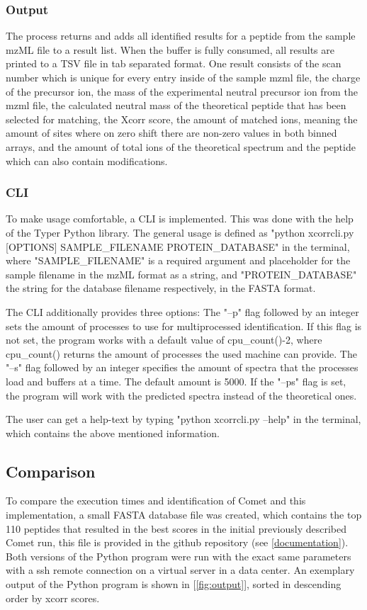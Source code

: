 \documentclass[11pt]{article}
\begin{document}
\subsubsection{Output}
The process returns and adds all identified results for a peptide from the sample mzML file to a result list. When the buffer is fully consumed, all results are printed to a TSV file in tab separated format. One result consists of the scan number which is unique for every entry inside of the sample mzml file, the charge of the precursor ion, the mass of the experimental neutral precursor ion from the mzml file, the calculated neutral mass of the theoretical peptide that has been selected for matching, the Xcorr score, the amount of matched ions, meaning the amount of sites where on zero shift there are non-zero values in both binned arrays, and the amount of total ions of the theoretical spectrum and the peptide which can also contain modifications.

\subsubsection{CLI}
To make usage comfortable, a CLI is implemented. This was done with the help of the Typer Python library. The general usage is defined as "python xcorrcli.py [OPTIONS] SAMPLE\_FILENAME PROTEIN\_DATABASE" in the terminal, where "SAMPLE\_FILENAME" is a required argument and placeholder for the sample filename in the mzML format as a string, and "PROTEIN\_DATABASE" the string for the database filename respectively, in the FASTA format. 

The CLI additionally provides three options: The "--p" flag followed by an integer sets the amount of processes to use for multiprocessed identification. If this flag is not set, the program works with a default value of cpu\_count()-2, where cpu\_count() returns the amount of processes the used machine can provide. The "--s" flag followed by an integer specifies the amount of spectra that the processes load and buffers at a time. The default amount is 5000. If the "--ps" flag is set, the program will work with the predicted spectra instead of the theoretical ones.

The user can get a help-text by typing "python xcorrcli.py --help" in the terminal, which contains the above mentioned information.

\subsection{Comparison}
To compare the execution times and identification of Comet and this implementation, a small FASTA database file was created, which contains the top 110 peptides that resulted in the best scores in the initial previously described Comet run, this file is provided in the github repository (see \ref{documentation}). Both versions of the Python program were run with the exact same parameters with a ssh remote connection on a virtual server in a data center.
An exemplary output of the Python program is shown in [\cref{fig:output}], sorted in descending order by xcorr scores.
\end{document}
